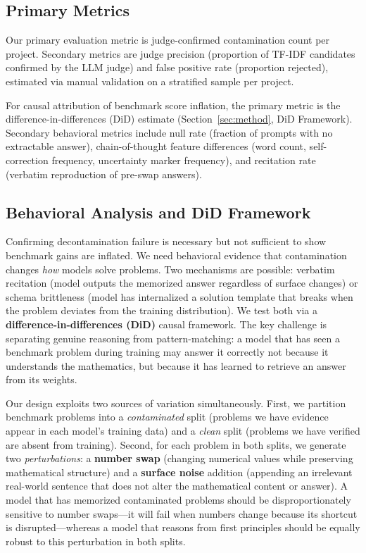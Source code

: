 \documentclass{article} %
\begin{document}
\subsection{Primary Metrics}

Our primary evaluation metric is judge-confirmed contamination count per project. Secondary metrics are judge precision (proportion of TF-IDF candidates confirmed by the LLM judge) and false positive rate (proportion rejected), estimated via manual validation on a stratified sample per project.

For causal attribution of benchmark score inflation, the primary metric is the difference-in-differences (DiD) estimate (Section~\ref{sec:method}, DiD Framework). Secondary behavioral metrics include null rate (fraction of prompts with no extractable answer), chain-of-thought feature differences (word count, self-correction frequency, uncertainty marker frequency), and recitation rate (verbatim reproduction of pre-swap answers).

\subsection{Behavioral Analysis and DiD Framework}

Confirming decontamination failure is necessary but not sufficient to show benchmark gains are inflated. We need behavioral evidence that contamination changes \emph{how} models solve problems. Two mechanisms are possible: verbatim recitation (model outputs the memorized answer regardless of surface changes) or schema brittleness (model has internalized a solution template that breaks when the problem deviates from the training distribution). We test both via a \textbf{difference-in-differences (DiD)} causal framework. The key challenge is separating genuine reasoning from pattern-matching: a model that has seen a benchmark problem during training may answer it correctly not because it understands the mathematics, but because it has learned to retrieve an answer from its weights.

Our design exploits two sources of variation simultaneously. First, we partition benchmark problems into a \emph{contaminated} split (problems we have evidence appear in each model's training data) and a \emph{clean} split (problems we have verified are absent from training). Second, for each problem in both splits, we generate two \emph{perturbations}: a \textbf{number swap} (changing numerical values while preserving mathematical structure) and a \textbf{surface noise} addition (appending an irrelevant real-world sentence that does not alter the mathematical content or answer). A model that has memorized contaminated problems should be disproportionately sensitive to number swaps---it will fail when numbers change because its shortcut is disrupted---whereas a model that reasons from first principles should be equally robust to this perturbation in both splits.
\end{document}
